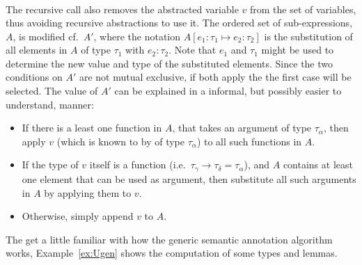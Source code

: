 \begin{definition}
\begin{align*}
\end{align*}
The recursive call also removes the abstracted variable $v$ from the set of variables, thus avoiding recursive abstractions to use it. The ordered set of sub-expressions, $A$, is modified cf.\ $A'$, where the notation $A[e_1 : \tau_1 \mapsto e_2 : \tau_2]$ is the substitution of all elements in $A$ of type $\tau_1$ with $e_2 : \tau_2$. Note that $e_1$ and $\tau_1$ might be used to determine the new value and type of the substituted elements. Since the two conditions on $A'$ are not mutual exclusive, if both apply the the first case will be selected. The value of $A'$ can be explained in a informal, but possibly easier to understand, manner: 
\begin{itemize}
	\item If there is a least one function in $A$, that takes an argument of type $\tau_\alpha$, then apply $v$ (which is known to by of type $\tau_\alpha$) to all such functions in $A$.
	\item If the type of $v$ itself is a function (i.e.\ $\tau_\gamma \to \tau_\delta = \tau_\alpha$), and $A$ contains at least one element that can be used as argument, then substitute all such arguments in $A$ by applying them to $v$.
	\item Otherwise, simply append $v$ to $A$.
\end{itemize} 
\label{def:Ugen}
\end{definition}
\done
\vspace*{-2em}
\clearpage

The get a little familiar with how the generic semantic annotation algorithm works, Example~\ref{ex:Ugen} shows the computation of some types and lemmas.

